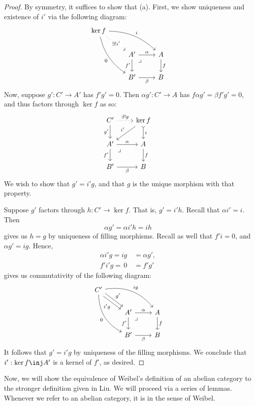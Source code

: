 \documentclass[12pt]{amsart}
\theoremstyle{definition}
\begin{document}
\begin{proof}
  By symmetry, it suffices to show that (a).
  First, we show uniqueness and existence of $i'$ via the following diagram:
  \[
    \begin{tikzcd}
      \ker f\ar[ddr,bend right= 20,"0"']\ar[drr,bend left = 20,"i"]\ar[dr,dotted,"\exists!i'" description]&\\
      &A'\ar[dr,phantom, very near start, "\lrcorner"] \ar[r,"\alpha"]\ar[d,"f'"'] & A\ar[d,"f"] \\
      &B'\ar[r,"\beta"'] & B
    \end{tikzcd}
  \] 
  Now, suppose $g':C'\to A'$ has $f'g'=0$.
  Then $\alpha g':C'\to A$ has $f\alpha g' = \beta f'g'=0$, and thus factors through $\ker f$ as so:
  \[
    \begin{tikzcd}
      C' \ar[r,dotted,"\exists!g"]\ar[d,"g'"']&\ker f\ar[dl,"i'"']\ar[d,tail,"i"] \\
      A'\ar[r,"\alpha"]\ar[d,"f'"']\ar[dr,phantom, very near start, "\lrcorner"] & A\ar[d,"f"] \\
      B'\ar[r,"\beta"'] & B
    \end{tikzcd}
  \] 
  We wish to show that $g'=i'g$, and that $g$ is the unique morphism with that property.

  Suppose $g'$ factors through $h:C'\to \ker f$.
  That is, $g'=i'h$.
  Recall that $\alpha i'=i$.
  Then 
  \[
    \alpha g' = \alpha i' h = ih
  \]
  gives us $h=g$ by uniqueness of filling morphisms.
  Recall as well that $f'i=0$, and $\alpha g'= ig$.
  Hence,
  \begin{align*}
    \alpha i'g = ig&=\alpha g', \\
    f'i'g = \,0\, &= f'g'
  \end{align*}
  gives us commutativity of the following diagram:
  \[
    \begin{tikzcd}
      C'\ar[ddr,bend right= 30,"0"']\ar[drr,bend left = 30,"ig"]\ar[dr,shift right,"i'g"']\ar[dr,shift left, "g'"]&\\
      &A'\ar[dr,phantom, very near start, "\lrcorner"] \ar[r,"\alpha"]\ar[d,"f'"'] & A\ar[d,"f"] \\
      &B'\ar[r,"\beta"'] & B
    \end{tikzcd}
  \] 
  It follows that $g'=i'g$ by uniqueness of the filling morphisms.
  We conclude that $i':\ker f\inj A'$ is a kernel of $f'$, as desired.
\end{proof}

Now, we will show the equivalence of Weibel's definition of an abelian category to the stronger definition given in Liu.
We will proceed via a series of lemmas.
Whenever we refer to an abelian category, it is in the sense of Weibel.
\end{document}
